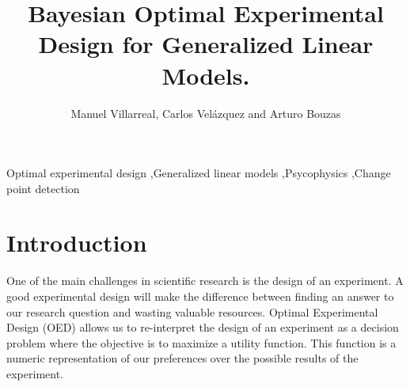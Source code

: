 \documentclass[preprint,review,12pt]{elsarticle}
\begin{document}
\begin{frontmatter}


\title{Bayesian Optimal Experimental Design for Generalized Linear Models.}




\author{Manuel Villarreal, Carlos Vel\'{a}zquez and Arturo Bouzas}

\address{Mexico City, Mexico}

\begin{abstract}
\end{abstract}

\begin{keyword}
Optimal experimental design \sep Generalized linear models \sep Psycophysics \sep Change point detection


\end{keyword}

\end{frontmatter}

\linenumbers

\section{Introduction}
\label{S:1}

One of the main challenges in scientific research is the design of an experiment. A good experimental design will make the difference between finding an answer to our research question and wasting valuable resources. Optimal Experimental Design (OED) allows us to re-interpret the design of an experiment as a decision problem where the objective is to maximize a utility function. This function is a numeric representation of our preferences over the possible results of the experiment.
\end{document}
